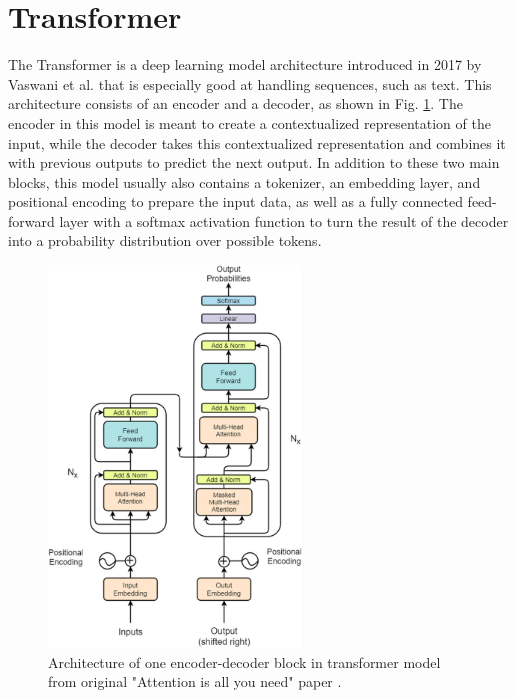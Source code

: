 \section{Transformer}
\label{theoryTrans}

The Transformer is a deep learning model architecture introduced in 2017 by Vaswani et al. \cite{attentionAllYouNeed} that is especially good at handling sequences, such as text. This architecture consists of an encoder and a decoder, as shown in Fig. \ref{fig:trans}. The encoder in this model is meant to create a contextualized representation of the input, while the decoder takes this contextualized representation and combines it with previous outputs to predict the next output. In addition to these two main blocks, this model usually also contains a tokenizer, an embedding layer, and positional encoding to prepare the input data, as well as a fully connected feed-forward layer with a softmax activation function to turn the result of the decoder into a probability distribution over possible tokens.

\begin{figure}[!h]
	\centering
	
	\includegraphics[width=0.6\textwidth]{images/trans_arch.png}
	
	\caption{Architecture of one encoder-decoder block in transformer model from original "Attention is all you need" paper \cite{attentionAllYouNeed}.}
	\label{fig:trans}
\end{figure}


